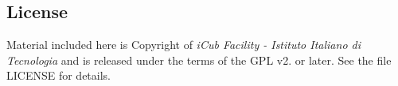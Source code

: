 \subsection*{License}

Material included here is Copyright of {\itshape i\+Cub Facility -\/ Istituto Italiano di Tecnologia} and is released under the terms of the G\+PL v2. or later. See the file L\+I\+C\+E\+N\+SE for details. 